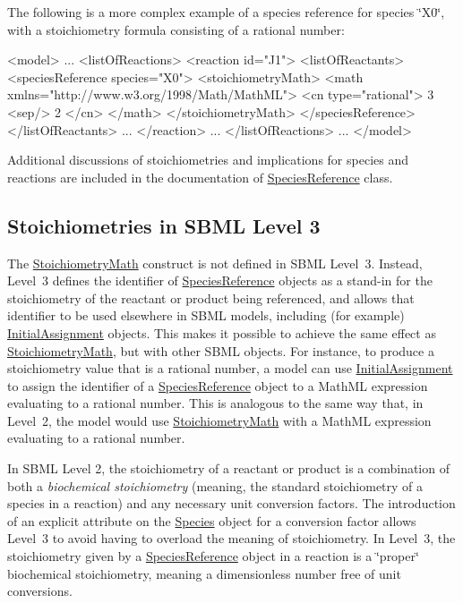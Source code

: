 The following is a more complex example of a species reference for species {\ttfamily \char`\"{}\+X0\char`\"{}}, with a stoichiometry formula consisting of a rational number\+: \begin{DoxyVerb}<model>
    ...
    <listOfReactions>
        <reaction id="J1">
            <listOfReactants>
                <speciesReference species="X0">
                    <stoichiometryMath>
                        <math xmlns="http://www.w3.org/1998/Math/MathML"> 
                            <cn type="rational"> 3 <sep/> 2 </cn>
                        </math>
                    </stoichiometryMath>
                </speciesReference>
            </listOfReactants>
            ...
        </reaction>
        ...
    </listOfReactions>
    ...
</model>
\end{DoxyVerb}


Additional discussions of stoichiometries and implications for species and reactions are included in the documentation of \hyperlink{class_species_reference}{Species\+Reference} class.\hypertarget{class_stoichiometry_math_l3-stoichiometries}{}\subsection{Stoichiometries in S\+B\+M\+L Level 3}\label{class_stoichiometry_math_l3-stoichiometries}
The \hyperlink{class_stoichiometry_math}{Stoichiometry\+Math} construct is not defined in S\+B\+ML Level~3. Instead, Level~3 defines the identifier of \hyperlink{class_species_reference}{Species\+Reference} objects as a stand-\/in for the stoichiometry of the reactant or product being referenced, and allows that identifier to be used elsewhere in S\+B\+ML models, including (for example) \hyperlink{class_initial_assignment}{Initial\+Assignment} objects. This makes it possible to achieve the same effect as \hyperlink{class_stoichiometry_math}{Stoichiometry\+Math}, but with other S\+B\+ML objects. For instance, to produce a stoichiometry value that is a rational number, a model can use \hyperlink{class_initial_assignment}{Initial\+Assignment} to assign the identifier of a \hyperlink{class_species_reference}{Species\+Reference} object to a Math\+ML expression evaluating to a rational number. This is analogous to the same way that, in Level~2, the model would use \hyperlink{class_stoichiometry_math}{Stoichiometry\+Math} with a Math\+ML expression evaluating to a rational number.

In S\+B\+ML Level 2, the stoichiometry of a reactant or product is a combination of both a {\itshape biochemical stoichiometry} (meaning, the standard stoichiometry of a species in a reaction) and any necessary unit conversion factors. The introduction of an explicit attribute on the \hyperlink{class_species}{Species} object for a conversion factor allows Level~3 to avoid having to overload the meaning of stoichiometry. In Level~3, the stoichiometry given by a \hyperlink{class_species_reference}{Species\+Reference} object in a reaction is a \char`\"{}proper\char`\"{} biochemical stoichiometry, meaning a dimensionless number free of unit conversions.

